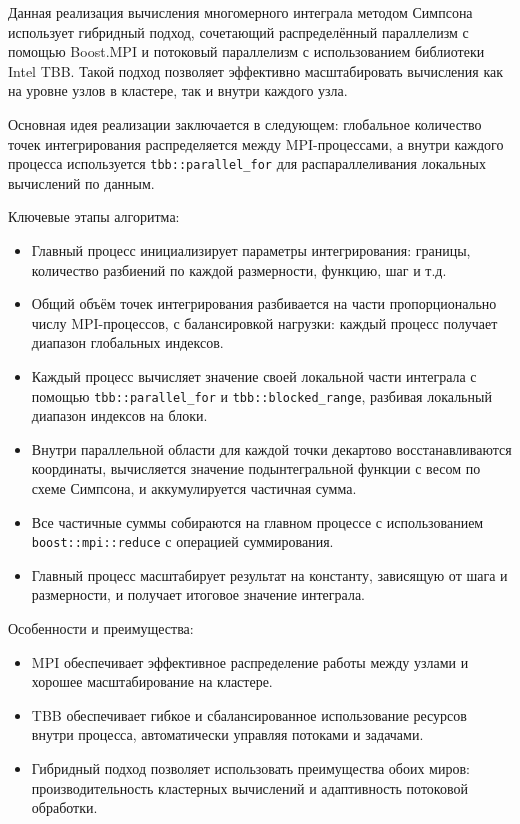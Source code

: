\documentclass[14pt,a4paper]{extarticle}
\begin{document}
Данная реализация вычисления многомерного интеграла методом Симпсона использует гибридный подход, сочетающий распределённый параллелизм с помощью Boost.MPI и потоковый параллелизм с использованием библиотеки Intel TBB. Такой подход позволяет эффективно масштабировать вычисления как на уровне узлов в кластере, так и внутри каждого узла.

Основная идея реализации заключается в следующем: глобальное количество точек интегрирования распределяется между MPI-процессами, а внутри каждого процесса используется \texttt{tbb::parallel\_for} для распараллеливания локальных вычислений по данным.

Ключевые этапы алгоритма:

\begin{itemize}
    \item Главный процесс инициализирует параметры интегрирования: границы, количество разбиений по каждой размерности, функцию, шаг и т.д.
    
    \item Общий объём точек интегрирования разбивается на части пропорционально числу MPI-процессов, с балансировкой нагрузки: каждый процесс получает диапазон глобальных индексов.
    
    \item Каждый процесс вычисляет значение своей локальной части интеграла с помощью \texttt{tbb::parallel\_for} и \texttt{tbb::blocked\_range}, разбивая локальный диапазон индексов на блоки.
    
    \item Внутри параллельной области для каждой точки декартово восстанавливаются координаты, вычисляется значение подынтегральной функции с весом по схеме Симпсона, и аккумулируется частичная сумма.
    
    \item Все частичные суммы собираются на главном процессе с использованием \texttt{boost::mpi::reduce} с операцией суммирования.
    
    \item Главный процесс масштабирует результат на константу, зависящую от шага и размерности, и получает итоговое значение интеграла.
\end{itemize}

Особенности и преимущества:

\begin{itemize}
    \item MPI обеспечивает эффективное распределение работы между узлами и хорошее масштабирование на кластере.
    \item TBB обеспечивает гибкое и сбалансированное использование ресурсов внутри процесса, автоматически управляя потоками и задачами.
    \item Гибридный подход позволяет использовать преимущества обоих миров: производительность кластерных вычислений и адаптивность потоковой обработки.
\end{itemize}
\end{document}
